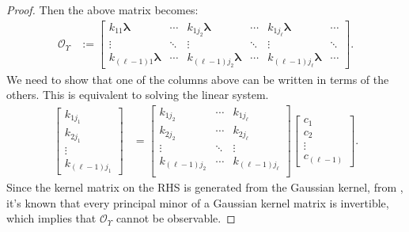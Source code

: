 \documentclass[letterpaper,12pt,peerreviewca,draftcls]{IEEEtran}
\newcommand{\la}{\lambda}
\newcommand{\kernel}{k}
\newcommand{\eval}{\la}
\newcommand{\Obs}{\mathcal{O}}
\newcommand{\Tset}{\Upsilon}
\newcommand{\minmeas}{\ell}
\newcommand{\evalvec}{\boldsymbol{\eval}}
\begin{document}
\begin{proof}
	Then the above matrix becomes:
	\begin{align*}
	\Obs_{\Tset}
	&:= 
	\begin{bmatrix}
	\kernel_{11}\evalvec  & \cdots & \kernel_{1j_2}\evalvec & \cdots & \kernel_{1j_{\minmeas}}\evalvec & \cdots\\
	\vdots & \ddots & \vdots & \ddots &\vdots & \ddots\\
	\kernel_{(\minmeas-1)1}\evalvec  & \cdots & \kernel_{(\minmeas-1)j_2}\evalvec & \cdots & \kernel_{(\minmeas-1)j_{\minmeas}}\evalvec & \cdots
	\end{bmatrix}.
	\end{align*}
	We need to show that one of the columns above can be written in terms of the others. This is equivalent to solving the linear system.
	\begin{align*}
	\begin{bmatrix}
	\kernel_{1j_1}\\
	\kernel_{2j_1}\\
	\vdots\\
	\kernel_{(\minmeas-1)j_1}
	\end{bmatrix}
	&=
	\begin{bmatrix}
	\kernel_{1j_2} & \cdots & \kernel_{1j_{\minmeas}}\\
	\kernel_{2j_2} & \cdots & \kernel_{2j_{\minmeas}}\\
	\vdots & \ddots & \vdots\\
	\kernel_{(\minmeas-1)j_2} & \cdots & \kernel_{(\minmeas-1)j_{\minmeas}}\\
	\end{bmatrix} 
	\begin{bmatrix}
	c_1\\
	c_2\\
	\vdots\\   
	c_{(\minmeas-1)}
	\end{bmatrix}. 
	\end{align*}
	Since the kernel matrix on the RHS is generated from the Gaussian kernel, from \cite{micchelli1984interpolation}, 
	it's known that every principal minor of a Gaussian kernel matrix is invertible, which implies that $\Obs_{\Tset}$ cannot be observable. 
\end{proof}
\end{document}
